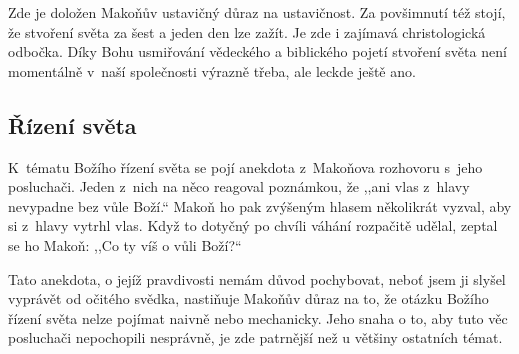 \begin{enumerate}
{Zde je doložen Makoňův ustavičný důraz na ustavičnost. Za povšimnutí též stojí,
že stvoření světa za šest a jeden den lze zažít. Je zde i zajímavá
christologická odbočka. Díky Bohu usmiřování vědeckého a biblického pojetí
stvoření světa není momentálně v~naší společnosti výrazně třeba, ale leckde
ještě ano.

}

\end{enumerate}

\subsection{Řízení světa}

K~tématu Božího řízení světa se pojí anekdota z~Makoňova rozhovoru s~jeho
posluchači. Jeden z~nich na něco reagoval poznámkou, že ,,ani vlas z~hlavy
nevypadne bez vůle Boží.`` Makoň ho pak zvýšeným hlasem několikrát vyzval, aby si
z~hlavy vytrhl vlas. Když to dotyčný po chvíli váhání rozpačitě udělal, zeptal
se ho Makoň: ,,Co ty víš o vůli Boží?{}``

Tato anekdota, o jejíž pravdivosti nemám důvod pochybovat, neboť jsem ji slyšel
vyprávět od očitého svědka, nastiňuje Makoňův důraz na to, že otázku Božího
řízení světa nelze pojímat naivně nebo mechanicky. Jeho snaha o to, aby tuto věc
posluchači nepochopili nesprávně, je zde patrnější než u většiny ostatních
témat.

